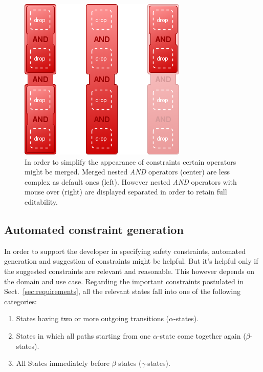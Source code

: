 \documentclass[conference]{IEEEtran}
\begin{document}
\begin{figure}[htbp]
  \centering
  \includegraphics[scale=0.4]{and_simplify} %
  \caption{In order to simplify the appearance of constraints certain operators might be merged. Merged nested \emph{AND} operators (center) are less complex as default ones (left). However nested \emph{AND} operators with mouse over (right) are displayed separated in order to retain full editability.}
  \label{fig:nested_and}
\end{figure}









\subsection{Automated constraint generation}
\label{sec:automatedconstraintgeneration}

In order to support the developer in specifying safety constraints, automated generation and suggestion of constraints might be helpful. But it's helpful only if the suggested constraints are relevant and reasonable. This however depends on the domain and use case.
Regarding the important constraints postulated in Sect.~\ref{sec:requirements}, all the relevant states fall into one of the following categories:

\begin{enumerate}
	\item States having two or more outgoing transitions ($\alpha$-states).
	\item States in which all paths starting from one $\alpha$-state come together again ($\beta$-states).
	\item All States immediately before $\beta$ states ($\gamma$-states).
\end{enumerate}
\end{document}
